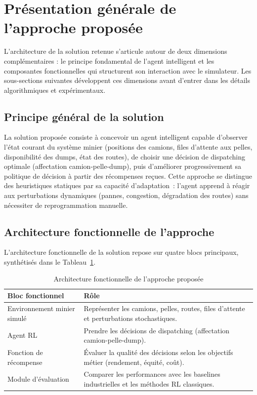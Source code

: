 \documentclass[11pt,a4paper]{report}
\begin{document}
\section{Présentation générale de l'approche proposée}
\label{sec:approche-proposee}

L'architecture de la solution retenue s'articule autour de deux dimensions complémentaires : le principe fondamental de l'agent intelligent et les composantes fonctionnelles qui structurent son interaction avec le simulateur. Les sous-sections suivantes développent ces dimensions avant d'entrer dans les détails algorithmiques et expérimentaux.

\subsection{Principe général de la solution}
\label{sec:principe-general}
La solution proposée consiste à concevoir un agent intelligent capable d'observer l'état courant du système minier (positions des camions, files d'attente aux pelles, disponibilité des dumps, état des routes), de choisir une décision de dispatching optimale (affectation camion-pelle-dump), puis d'améliorer progressivement sa politique de décision à partir des récompenses reçues. Cette approche se distingue des heuristiques statiques par sa capacité d'adaptation~: l'agent apprend à réagir aux perturbations dynamiques (pannes, congestion, dégradation des routes) sans nécessiter de reprogrammation manuelle.

\subsection{Architecture fonctionnelle de l'approche}
\label{sec:architecture-fonctionnelle}
L'architecture fonctionnelle de la solution repose sur quatre blocs principaux, synthétisés dans le Tableau~\ref{tab:architecture-fonctionnelle}.

\begin{table}[H]
\centering
\caption{Architecture fonctionnelle de l'approche proposée}
\label{tab:architecture-fonctionnelle}
\begin{tabular}{lp{9cm}}
\toprule
\textbf{Bloc fonctionnel} & \textbf{Rôle} \\
\midrule
Environnement minier simulé & Représenter les camions, pelles, routes, files d'attente et perturbations stochastiques. \\
Agent RL & Prendre les décisions de dispatching (affectation camion-pelle-dump). \\
Fonction de récompense & Évaluer la qualité des décisions selon les objectifs métier (rendement, équité, coût). \\
Module d'évaluation & Comparer les performances avec les baselines industrielles et les méthodes RL classiques. \\
\bottomrule
\end{tabular}
\end{table}
\end{document}
